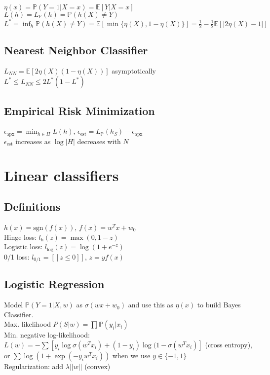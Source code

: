 $\eta(x) = \mathbb{P}(Y=1|X=x) = \mathbb{E}[Y|X=x]$\\
$L(h) = L_{\mathbb{P}}(h) = \mathbb{P}(h(X)\neq Y)$\\
$L^* = \inf_h \mathbb{P}(h(X) \neq Y) = \mathbb{E}[\min\{\eta(X), 1-\eta(X)\}] = \frac{1}{2} - \frac{1}{2}\mathbb{E}[|2\eta(X) - 1|]$

\subsection*{Nearest Neighbor Classifier}

$L_{NN} = \mathbb{E}[2\eta(X)(1-\eta(X))]$ asymptotically\\
$L^* \leq L_{NN} \leq 2L^*(1-L^*)$

\subsection*{Empirical Risk Minimization}

$\epsilon_{\text{apx}} = \min_{h \in H}L(h)$, $\epsilon_{\text{est}} = L_\mathbb{P}(h_S) - \epsilon_{\text{apx}}$\\
$\epsilon_{\text{est}}$ increases as $\log |H|$ decreases with $N$

\section{Linear classifiers}

\subsection*{Definitions}

$h(x) = \text{sgn}(f(x))$, $f(x) = w^T x + w_0$\\
Hinge loss: $l_{\text{h}}(z) = \max(0, 1-z)$\\
Logistic loss: $l_{\log}(z) = \log(1+e^{-z})$\\
0/1 loss: $l_{\text{0/1}} = [[z \leq 0]]$, $z = yf(x)$

\subsection*{Logistic Regression}

Model $\mathbb{P}(Y=1|X, w)$ as $\sigma(w x +w_0)$ and use this as $\eta(x)$ to build Bayes Classifier.\\
Max. likelihood $P(S|w) = \prod \mathbb{P}(y_i|x_i)$\\
Min. negative log-likelihood:\\
$L(w) = -\sum[y_i \log \sigma(w^T x_i) + (1 - y_i) \log(1 - \sigma(w^T x_i)]$ (cross entropy), or $\sum \log(1 + \exp(-y_i w^T x_i))$ when we use $y \in \{-1, 1\}$\\
Regularization: add $\lambda ||w||$ (convex)

